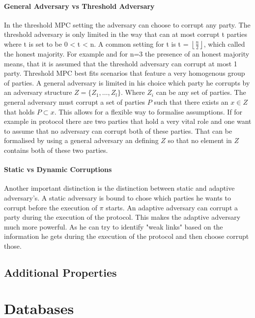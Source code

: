 \paragraph{General Adversary vs Threshold Adversary}
In the threshold MPC setting the adversary can choose to corrupt any party. The threshold adversary is only limited in the way that can at most corrupt t parties where t is set to be 0 < t < n. A common setting for t is t = $\left \lfloor{ \frac{n}{2} }\right \rfloor  $, which called the honest majority. For example and for n=3 the presence of an honest majority means, that it is assumed that the threshold adversary can corrupt at most 1 party. Threshold MPC best fits scenarios that feature a very homogenous group of parties. A general adversary is limited in his choice which party he corrupts by an adversary structure  
$ Z = \{ Z_1, \dots, Z_l  \} $. Where $ Z_i $ can be any set of parties. The general adversary must corrupt a set of parties  $ P $ such that there exists an $ x \in Z $ that holds $ P \subset x $. This allows for a flexible way to formalise assumptions. If for example in protocol there are two parties that hold a very vital role and one want to assume that no adversary can corrupt both of these parties. That can be formalised by using a general adversary an defining $ Z $ so that no element in  $Z $ contains both of these two parties.  
 
\paragraph{Static vs Dynamic Corruptions}
Another important distinction is the distinction between static and adaptive adversary's. A static adversary is bound to chose which parties he wants to corrupt before the execution of $ \pi $ starts. An adaptive adversary can corrupt a party during the execution of the protocol. This makes the adaptive adversary much more powerful. As he can try to identify "weak links" based on the information he gets during the execution of the protocol and then choose corrupt those.   


\subsection{Additional Properties}

\section{Databases}
